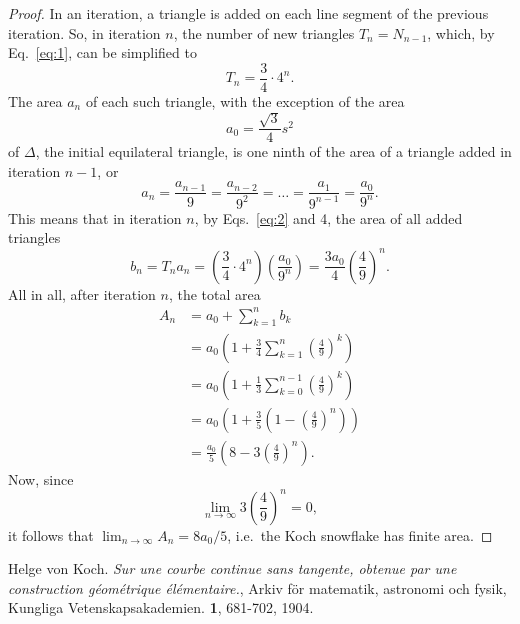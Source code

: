 \documentclass[12pt,a4paper]{article}
\begin{document}
		\begin{proof}
			  In an iteration, a triangle is added on each line segment of the previous iteration. So, in iteration $n$, the number of new triangles $T_n = N_{n-1}$, which, by
			  Eq.~\ref{eq:1}, can be simplified to 
			  \begin{equation}
			   	\label{eq:2}
			   	T_n =\frac{3}{4} \cdot 4^n .
			  \end{equation}
			   The area $a_n$ of each such triangle, with the exception of the area
			 \begin{displaymath}
				a_0 = \frac{\sqrt{3}}{4}s^2
			 \end{displaymath}
			 of $\Delta$, the initial equilateral triangle, is one ninth of the area of a triangle added in iteration $n-1$, or
			\begin{equation}
				\label{eq:3}
				a_n=\frac{a_{n-1}}{9}=\frac{a_{n-2}}{9^2}=\ldots=\frac{a_{1}}{9^{n-1}}=\frac{a_{0}}{9^n}.
			 \end{equation}
			 This means that in iteration $n$, by Eqs.~\ref{eq:2} and 4, the area of all added triangles  
			 \begin{displaymath}
				b_n=T_ {n}a_{n}=\left(\frac{3}{4}\cdot4^n\right)\left(\frac{a_0}{9^n}\right)=\frac{3a_0}{4}\left(\frac{4}{9}\right)^n.
			 \end{displaymath}
			   All in all, after iteration $n$, the total area
			  \begin{align*}
			           A_n &= a_0 + \sum_{k=1}^n b_k \\
			           &=a_0\left(1+\frac{3}{4}\sum_{k=1}^n\left(\frac{4}{9}\right)^k \right) \\
				&=a_0\left(1+\frac{1}{3}\sum_{k=0}^{n-1}\left(\frac{4}{9}\right)^k \right) \\
				&=a_0\left(1+\frac{3}{5}\left(1-\left(\frac{4}{9}\right)^n\right)\right)\\
				&=\frac{a_0}{5}\left(8-3\left(\frac{4}{9}\right)^n \right).
			   \end{align*}
			  Now, since
			\begin{displaymath}
			   \lim_{n \to \infty}3\left(\frac{4}{9}\right)^n=0,
			\end{displaymath}
			 it follows that $\lim_{n \to \infty}A_n=8a_0/5$, i.e.\ the Koch snowflake has finite area.  
		\end{proof}
	\begin{thebibliography}{99}
	   Helge von Koch. 
	    \emph{Sur une courbe continue sans tangente, obtenue par une
	    construction géométrique élémentaire.}, 
	    Arkiv för matematik, astronomi och fysik, 
	    Kungliga Vetenskapsakademien. 
	    \textbf{1}, 681-702, 1904.
	\end{thebibliography}
\end{document}
